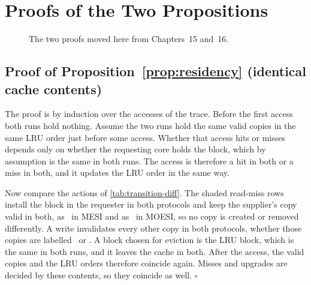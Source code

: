 \chapter{Proofs of the Two Propositions}
\label{app:proofs}
%

\begin{figure}[htbp]
\centering
{}
\caption[]{The two proofs moved here from
Chapters~15 and~16.}
\label{fig:app-proofs-map}
\end{figure}

\section{Proof of Proposition~\ref*{prop:residency} (identical cache contents)}
\label{app:proof-residency}
%

The proof is by induction over the accesses of the trace. Before the first access
both runs hold nothing. Assume the two runs hold the same valid copies in the same
LRU order just before some access. Whether that access hits or misses depends only
on whether the requesting core holds the block, which by assumption is the same in
both runs. The access is therefore a hit in both or a miss in both, and it updates
the LRU order in the same way.

Now compare the actions of \cref{tab:transition-diff}. The shaded read-miss rows
install the block in the requester in both protocols and keep the supplier's copy
valid in both, as \stS\ in MESI and as \stO\ in MOESI, so no copy is created or
removed differently. A write invalidates every other copy in both protocols,
whether those copies are labelled \stS\ or \stO. A block chosen for eviction is the
LRU block, which is the same in both runs, and it leaves the cache in both. After
the access, the valid copies and the LRU orders therefore coincide again. Misses and
upgrades are decided by these contents, so they coincide as well. $\square$

